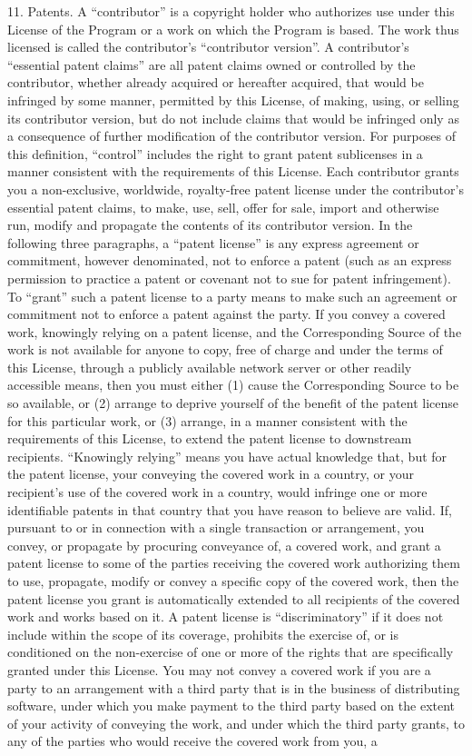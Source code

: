 \documentclass {book}
\begin{document}
\begin{tiny}
11. Patents. A ``contributor'' is a copyright holder who authorizes use under this License of the Program or a work on which the Program is based. The work thus licensed is called the contributor's ``contributor version''. A contributor's ``essential patent claims'' are all patent claims owned or controlled by the contributor, whether already acquired or hereafter acquired, that would be infringed by some manner, permitted by this License, of making, using, or selling its contributor version, but do not include claims that would be infringed only as a consequence of further modification of the contributor version. For purposes of this definition, ``control'' includes the right to grant patent sublicenses in a manner consistent with the requirements of this License. Each contributor grants you a non-exclusive, worldwide, royalty-free patent license under the contributor's essential patent claims, to make, use, sell, offer for sale, import and otherwise run, modify and propagate the contents of its contributor version. In the following three paragraphs, a ``patent license'' is any express agreement or commitment, however denominated, not to enforce a patent (such as an express permission to practice a patent or covenant not to sue for patent infringement). To ``grant'' such a patent license to a party means to make such an agreement or commitment not to enforce a patent against the party. If you convey a covered work, knowingly relying on a patent license, and the Corresponding Source of the work is not available for anyone to copy, free of charge and under the terms of this License, through a publicly available network server or other readily accessible means, then you must either (1) cause the Corresponding Source to be so available, or (2) arrange to deprive yourself of the benefit of the patent license for this particular work, or (3) arrange, in a manner consistent with the requirements of this License, to extend the patent license to downstream recipients. ``Knowingly relying'' means you have actual knowledge that, but for the patent license, your conveying the covered work in a country, or your recipient's use of the covered work in a country, would infringe one or more identifiable patents in that country that you have reason to believe are valid. If, pursuant to or in connection with a single transaction or arrangement, you convey, or propagate by procuring conveyance of, a covered work, and grant a patent license to some of the parties receiving the covered work authorizing them to use, propagate, modify or convey a specific copy of the covered work, then the patent license you grant is automatically extended to all recipients of the covered work and works based on it. A patent license is ``discriminatory'' if it does not include within the scope of its coverage, prohibits the exercise of, or is conditioned on the non-exercise of one or more of the rights that are specifically granted under this License. You may not convey a covered work if you are a party to an arrangement with a third party that is in the business of distributing software, under which you make payment to the third party based on the extent of your activity of conveying the work, and under which the third party grants, to any of the parties who would receive the covered work from you, a 
\end{tiny}
\end{document}
